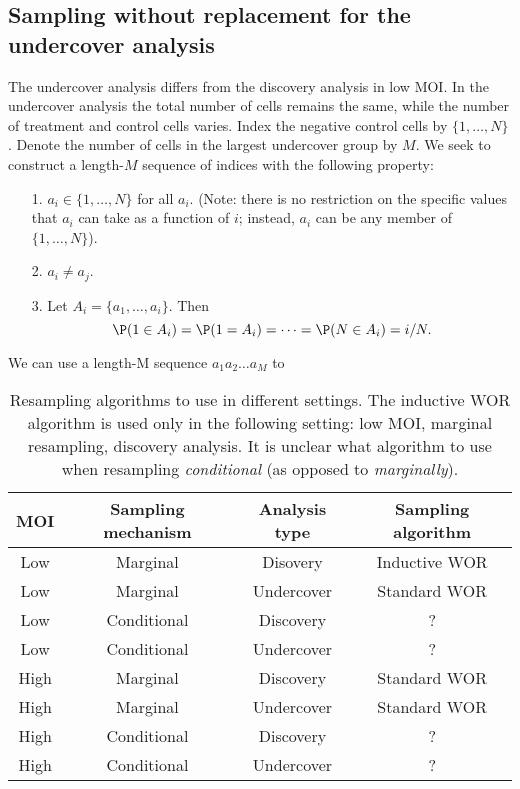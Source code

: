 \documentclass[12pt]{article}
\begin{document}
\subsection*{Sampling without replacement for the undercover analysis}

The undercover analysis differs from the discovery analysis in low MOI. In the undercover analysis the total number of cells remains the same, while the number of treatment and control cells varies. Index the negative control cells by $\{1, \dots, N\}$. Denote the number of cells in the largest undercover group by $M$. We seek to construct a length-$M$ sequence of indices with the following property:

\begin{itemize}
\item[1.] $a_i \in \{1, \dots, N\}$ for all $a_i$. (Note: there is no restriction on the specific values that $a_i$ can take as a function of $i$; instead, $a_i$ can be any member of $ \{1, \dots, N \}$).
\item[2.] $a_i \neq a_j$.
\item[3.] Let $A_i = \{ a_1, \dots, a_i \}.$ Then
$$ \P( 1 \in A_i ) = \P(1 = A_i) = \dots = \P(N \in A_i ) = i/N.$$
\end{itemize}

We can use a length-M sequence $a_1 a_2 \dots a_M$ to 

\begin{table}
\begin{tabular}{cccc}
	\hline 
	\textbf{MOI} & \textbf{Sampling mechanism} & \textbf{Analysis type} & \textbf{Sampling algorithm} \\ 
	\hline 
	Low & Marginal & Disovery &  Inductive WOR \\
	\hline 
	Low & Marginal & Undercover & Standard WOR \\ 
	\hline 
	Low & Conditional & Discovery &  ? \\ 
	\hline 
	Low & Conditional & Undercover & ? \\ 
	\hline 
	High & Marginal & Discovery & Standard WOR \\ 
	\hline 
	High & Marginal & Undercover & Standard WOR  \\ 
	\hline 
	High & Conditional & Discovery & ? \\ 
	\hline 
	High & Conditional & Undercover & ? \\ 
	\hline 
\end{tabular}
	\caption{Resampling algorithms to use in different settings. The inductive WOR algorithm is used only in the following setting: low MOI, marginal resampling, discovery analysis. It is unclear what algorithm to use when resampling \textit{conditional} (as opposed to \textit{marginally}).}
\end{table}



\end{document}
